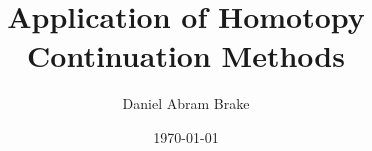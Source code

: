 \linespread{1} %


\renewcommand{\abstract}{
\newpage\null\vskip 60pt
\begin{center}
ABSTRACT \\
[\baselineskip]\uppercase\expandafter{\Ztitle}
\end{center}
\vskip 20pt plus 2pt minus 2pt}

\renewcommand{\endabstract}{
\vskip 15pt
\begin{flushright}
\singlespace{\Zauthor\\
Department of Mathematics\\
Colorado State University\\
Fort Collins, Colorado 80523\\
\Zsemester}
\end{flushright}
\newpage}


\author{Daniel Abram Brake}
\title{Application of Homotopy Continuation Methods}
\date{\today}

